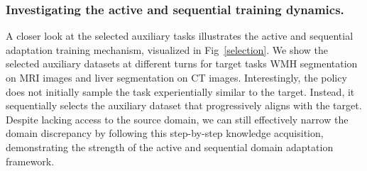 \vspace{-0.4cm}
\subsubsection{Investigating the active and sequential training dynamics.}
\vspace{-0.2cm}
A closer look at the selected auxiliary tasks illustrates the active and sequential adaptation training mechanism, visualized in Fig~\ref{selection}.
We show the selected auxiliary datasets at different turns for target tasks WMH segmentation on MRI images and liver segmentation on CT images.
Interestingly, the policy does not initially sample the task experientially similar to the target. Instead, it sequentially selects the auxiliary dataset that progressively aligns with the target.
Despite lacking access to the source domain, we can still effectively narrow the domain discrepancy by following this step-by-step knowledge acquisition, demonstrating the strength of the active and sequential domain adaptation framework.

